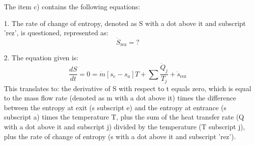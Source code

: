 The item c) contains the following equations:

1. The rate of change of entropy, denoted as S with a dot above it and subscript 'rez', is questioned, represented as:
   \[
   \dot{S}_{\text{rez}} = ?
   \]

2. The equation given is:
   \[
   \frac{dS}{dt} = 0 = \dot{m} \left[ s_e - s_a \right] T + \sum \frac{\dot{Q}_j}{T_j} + \dot{s}_{\text{rez}}
   \]
   This translates to: the derivative of S with respect to t equals zero, which is equal to the mass flow rate (denoted as m with a dot above it) times the difference between the entropy at exit (s subscript e) and the entropy at entrance (s subscript a) times the temperature T, plus the sum of the heat transfer rate (Q with a dot above it and subscript j) divided by the temperature (T subscript j), plus the rate of change of entropy (s with a dot above it and subscript 'rez').